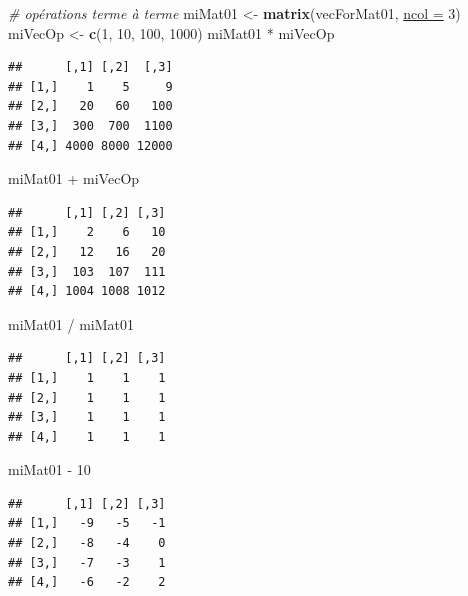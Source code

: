 \documentclass[twoside,symmetric]{book}
\newenvironment{Shaded}{}{}
\newcommand{\CommentTok}[1]{\textit{#1}}
\newcommand{\DataTypeTok}[1]{\underline{#1}}
\newcommand{\DecValTok}[1]{#1}
\newcommand{\KeywordTok}[1]{\textbf{#1}}
\newcommand{\NormalTok}[1]{#1}
\newcommand{\OperatorTok}[1]{#1}
\newcommand{\StringTok}[1]{#1}
\begin{document}
\begin{Shaded}
\begin{Highlighting}[]
\CommentTok{# opérations terme à terme}
\NormalTok{miMat01 <-}\StringTok{ }\KeywordTok{matrix}\NormalTok{(vecForMat01, }\DataTypeTok{ncol =} \DecValTok{3}\NormalTok{)}
\NormalTok{miVecOp <-}\StringTok{ }\KeywordTok{c}\NormalTok{(}\DecValTok{1}\NormalTok{, }\DecValTok{10}\NormalTok{, }\DecValTok{100}\NormalTok{, }\DecValTok{1000}\NormalTok{)}
\NormalTok{miMat01 }\OperatorTok{*}\StringTok{ }\NormalTok{miVecOp}
\end{Highlighting}
\end{Shaded}

\begin{verbatim}
##      [,1] [,2]  [,3]
## [1,]    1    5     9
## [2,]   20   60   100
## [3,]  300  700  1100
## [4,] 4000 8000 12000
\end{verbatim}

\begin{Shaded}
\begin{Highlighting}[]
\NormalTok{miMat01 }\OperatorTok{+}\StringTok{ }\NormalTok{miVecOp}
\end{Highlighting}
\end{Shaded}

\begin{verbatim}
##      [,1] [,2] [,3]
## [1,]    2    6   10
## [2,]   12   16   20
## [3,]  103  107  111
## [4,] 1004 1008 1012
\end{verbatim}

\begin{Shaded}
\begin{Highlighting}[]
\NormalTok{miMat01 }\OperatorTok{/}\StringTok{ }\NormalTok{miMat01}
\end{Highlighting}
\end{Shaded}

\begin{verbatim}
##      [,1] [,2] [,3]
## [1,]    1    1    1
## [2,]    1    1    1
## [3,]    1    1    1
## [4,]    1    1    1
\end{verbatim}

\begin{Shaded}
\begin{Highlighting}[]
\NormalTok{miMat01 }\OperatorTok{-}\StringTok{ }\DecValTok{10}
\end{Highlighting}
\end{Shaded}

\begin{verbatim}
##      [,1] [,2] [,3]
## [1,]   -9   -5   -1
## [2,]   -8   -4    0
## [3,]   -7   -3    1
## [4,]   -6   -2    2
\end{verbatim}
\end{document}
